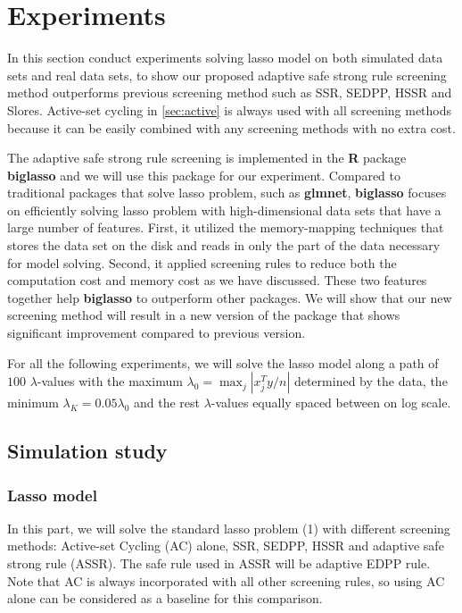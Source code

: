 \documentclass{article}
\begin{document}
\section{Experiments}
\label{sec:5}

In this section conduct experiments solving lasso model on both simulated data sets and real data sets, to show our proposed adaptive safe strong rule screening method outperforms previous screening method such as SSR, SEDPP, HSSR and Slores. Active-set cycling in \ref{sec:active} is always used with all screening methods because it can be easily combined with any screening methods with no extra cost.

The adaptive safe strong rule screening is implemented in the \textbf{R} package \textbf{biglasso} and we will use this package for our experiment. Compared to traditional packages that solve lasso problem, such as \textbf{glmnet}, \textbf{biglasso} focuses on efficiently solving lasso problem with high-dimensional data sets that have a large number of features. First, it utilized the memory-mapping techniques that stores the data set on the disk and reads in only the part of the data necessary for model solving. Second, it applied screening rules to reduce both the computation cost and memory cost as we have discussed. These two features together help \textbf{biglasso} to outperform other packages. We will show that our new screening method will result in a new version of the package that shows significant improvement compared to previous version. 

For all the following experiments, we will solve the lasso model along a path of $100$ $\lambda$-values with the maximum $\lambda_0=\max_j|x_j^Ty/n|$ determined by the data, the minimum $\lambda_K=0.05\lambda_0$ and the rest $\lambda$-values equally spaced between on log scale.

\subsection{Simulation study}
\label{sec:sim}

\subsubsection{Lasso model}

In this part, we will solve the standard lasso problem (1) with different screening methods: Active-set Cycling (AC) alone, SSR, SEDPP, HSSR and adaptive safe strong rule (ASSR). The safe rule used in ASSR will be adaptive EDPP rule. Note that AC is always incorporated with all other screening rules, so using AC alone can be considered as a baseline for this comparison.
\end{document}
